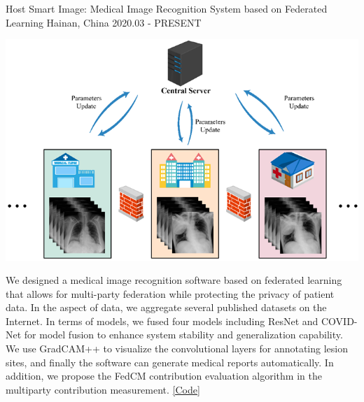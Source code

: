 



\begin{cventries}


	\cventry
	{Host} %
	{Smart Image: Medical Image Recognition System based on Federated Learning} %
	{Hainan, China} %
	{2020.03 - PRESENT} %
	{
		\begin{minipage}[b]{0.25\linewidth}
			\includegraphics[height=8\baselineskip]{figure/fedcov.png}
		\end{minipage}
		\hfill
		\begin{minipage}[b]{0.7\linewidth}
			We designed a medical image recognition software based on federated learning that allows for multi-party federation while protecting the privacy of patient data. In the aspect of data, we aggregate several published datasets on the Internet. In terms of models, we fused four models including ResNet and COVID-Net for model fusion to enhance system stability and generalization capability. We use GradCAM++ to visualize the convolutional layers for annotating lesion sites, and finally the software can generate medical reports automatically. In addition, we propose the FedCM contribution evaluation algorithm in the multiparty contribution measurement. \textcolor{awesome-red}{\href{https://github.com/beiyuouo/paddle-fl-gui}{[Code]}}
		\end{minipage}
	}


\end{cventries}
